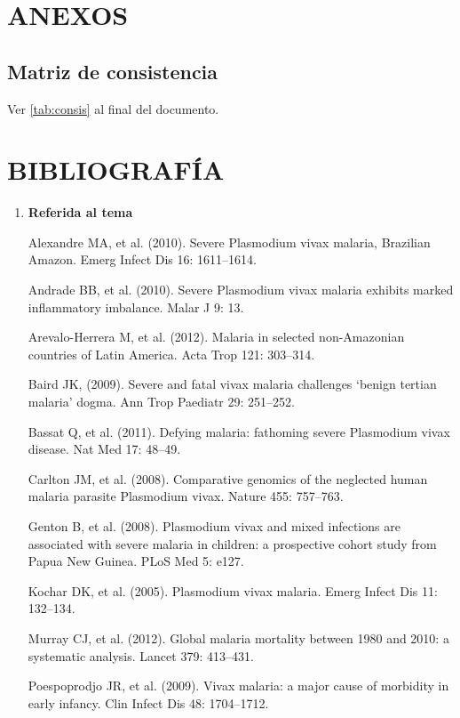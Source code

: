 \documentclass[]{article}
\begin{document}
\section{ANEXOS}\label{anexos}

\subsection{Matriz de consistencia}\label{matriz-de-consistencia}

Ver \autoref{tab:consis} al final del documento.

\section{BIBLIOGRAFÍA}\label{bibliografia}

\begin{enumerate}
\def\labelenumi{\arabic{enumi}.}
\item
  \textbf{Referida al tema}

  Alexandre MA, et al. (2010). Severe Plasmodium vivax malaria,
  Brazilian Amazon. Emerg Infect Dis 16: 1611--1614.

  Andrade BB, et al. (2010). Severe Plasmodium vivax malaria exhibits
  marked inflammatory imbalance. Malar J 9: 13.

  Arevalo-Herrera M, et al. (2012). Malaria in selected non-Amazonian
  countries of Latin America. Acta Trop 121: 303--314.

  Baird JK, (2009). Severe and fatal vivax malaria challenges `benign
  tertian malaria' dogma. Ann Trop Paediatr 29: 251--252.

  Bassat Q, et al. (2011). Defying malaria: fathoming severe Plasmodium
  vivax disease. Nat Med 17: 48--49.

  Carlton JM, et al. (2008). Comparative genomics of the neglected human
  malaria parasite Plasmodium vivax. Nature 455: 757--763.

  Genton B, et al. (2008). Plasmodium vivax and mixed infections are
  associated with severe malaria in children: a prospective cohort study
  from Papua New Guinea. PLoS Med 5: e127.

  Kochar DK, et al. (2005). Plasmodium vivax malaria. Emerg Infect Dis
  11: 132--134.

  Murray CJ, et al. (2012). Global malaria mortality between 1980 and
  2010: a systematic analysis. Lancet 379: 413--431.

  Poespoprodjo JR, et al. (2009). Vivax malaria: a major cause of
  morbidity in early infancy. Clin Infect Dis 48: 1704--1712.


\end{enumerate}
\end{document}
